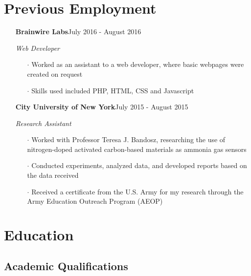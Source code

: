 \documentclass[11pt,letterpaper]{moderncv}
\begin{document}
\makecvtitle
\vspace{-36pt}
\section{Previous Employment}


\begin{itemize}

	\item[]{\textbf{Brainwire Labs}\hfill {July 2016 - August 2016}}
	\vspace{-10pt}
	\item[]{\textit{Web Developer}}
	\vspace{-8pt}
	\begin{itemize}
		\item[$\cdot$]{Worked as an assistant to a web developer, where basic webpages were created on request}
		\vspace{-4pt}
		\item[$\cdot$]{Skills used included PHP, HTML, CSS and Javascript}
	\end{itemize}
	\vspace{-10pt}
	\item[]{\textbf{City University of New York}\hfill {July 2015 - August 2015}}
	\vspace{-10pt}
	\item[]{\textit{Research Assistant} }
	\vspace{-8pt}
	\begin{itemize}
		\item[$\cdot$]{Worked with Professor Teresa J. Bandosz, researching the use of nitrogen-doped activated carbon-based materials as ammonia gas sensors}
		\vspace{-4pt}
		\item[$\cdot$]{Conducted experiments, analyzed data, and developed reports based on the data received}
		\vspace{-4pt}
		\item[$\cdot$]{Received a certificate from the U.S. Army for my research through the Army Education Outreach Program (AEOP)}
	\end{itemize}

\end{itemize}
\vspace{-16pt}
\section{Education}
\subsection{Academic Qualifications}
\end{document}
